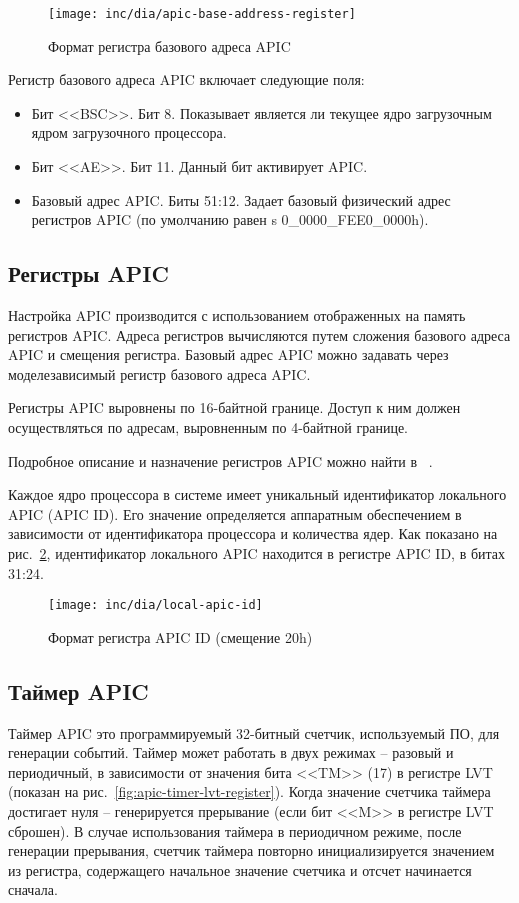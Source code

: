 \begin{figure}[ht!]
  \centering
  \texttt{[image: inc/dia/apic-base-address-register]}
  \caption{Формат регистра базового адреса APIC}
  \label{fig:apic-base-address-register}
\end{figure}

Регистр базового адреса APIC включает следующие поля:
\begin{itemize}
\item Бит <<BSC>>. Бит 8. Показывает является ли текущее ядро загрузочным ядром загрузочного процессора.
\item Бит <<AE>>. Бит 11. Данный бит активирует APIC.
\item Базовый адрес APIC. Биты 51:12. Задает базовый физический адрес регистров APIC (по умолчанию
	равен s 0\_0000\_FEE0\_0000h).
\end{itemize}

\subsection{Регистры APIC}
Настройка APIC производится с использованием отображенных на память регистров APIC.
Адреса регистров вычисляются путем сложения базового адреса APIC и смещения регистра.
Базовый адрес APIC можно задавать через моделезависимый регистр базового адреса APIC.

Регистры APIC выровнены по 16-байтной границе. Доступ к ним должен осуществляться
по адресам, выровненным по 4-байтной границе.

Подробное описание и назначение регистров APIC можно найти в ~\cite{amd_pm_v2}.

Каждое ядро процессора в системе имеет уникальный идентификатор локального APIC (APIC ID).
Его значение определяется аппаратным обеспечением в зависимости от идентификатора процессора
и количества ядер. Как показано на рис.~\ref{fig:local-apic-id}, идентификатор локального APIC
находится в регистре APIC ID, в битах 31:24.

\begin{figure}[ht!]
  \centering
  \texttt{[image: inc/dia/local-apic-id]}
  \caption{Формат регистра APIC ID (смещение 20h)}
  \label{fig:local-apic-id}
\end{figure}

\subsection{Таймер APIC}
Таймер APIC это программируемый 32-битный счетчик, используемый ПО, для генерации событий.
Таймер может работать в двух режимах -- разовый и периодичный, в зависимости от значения бита <<TM>> (17)
в регистре LVT (показан на рис.~\ref{fig:apic-timer-lvt-register}). Когда значение счетчика таймера
достигает нуля -- генерируется прерывание (если бит <<M>> в регистре LVT сброшен). В случае использования
таймера в периодичном режиме, после генерации прерывания, счетчик таймера повторно инициализируется
значением из регистра, содержащего начальное значение счетчика и отсчет начинается сначала.

